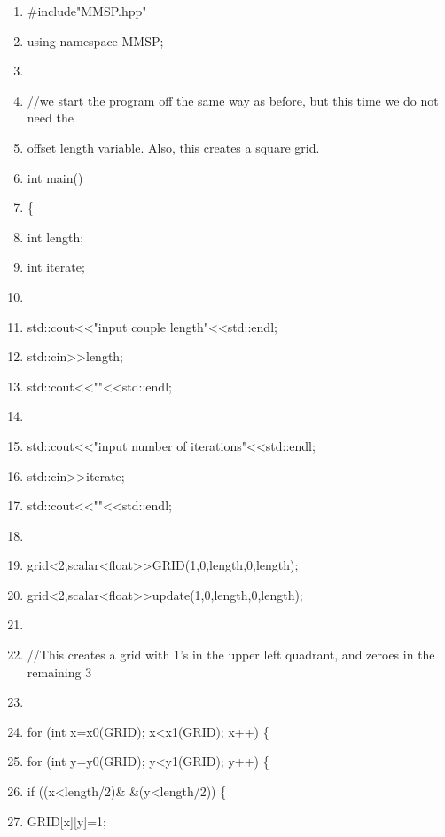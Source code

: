 \documentclass[10pt]{article}
\begin{document}
\begin{shadebox}
\begin{enumerate} \itemsep1pt \parskip0pt 
\item \#include"MMSP.hpp"
\item using namespace MMSP; 
\item 
\item //we start the program off the same way as before, but this time we do not need the 
\item offset length variable. Also, this creates a square grid.
\item int main()
\item \{ 
\item int length;
\item int iterate;
\item 
\item std::cout\textless \textless "input couple length"\textless \textless std::endl;
\item std::cin\textgreater \textgreater length;
\item std::cout\textless \textless ""\textless \textless std::endl;
\item 
\item std::cout\textless \textless "input number of iterations"\textless \textless std::endl;
\item std::cin\textgreater \textgreater iterate;
\item std::cout\textless \textless ""\textless \textless std::endl;
\item 
\item grid\textless 2,scalar\textless float\textgreater  \textgreater  GRID(1,0,length,0,length); 
\item grid\textless 2,scalar\textless float\textgreater  \textgreater  update(1,0,length,0,length);
\item 
\item //This creates a grid with 1’s in the upper left quadrant, and zeroes in the remaining 3
\item 
\item for (int x=x0(GRID); x\textless x1(GRID); x++) \{
\item \hspace{10pt}         for (int y=y0(GRID); y\textless y1(GRID); y++) \{ 
\item \hspace{10pt} \hspace{10pt}                 if ((x\textless length/2)\& \&(y\textless length/2)) \{
\item \hspace{10pt} \hspace{10pt} \hspace{10pt}                         GRID[x][y]=1;

\end{enumerate}
\end{shadebox}
\end{document}
